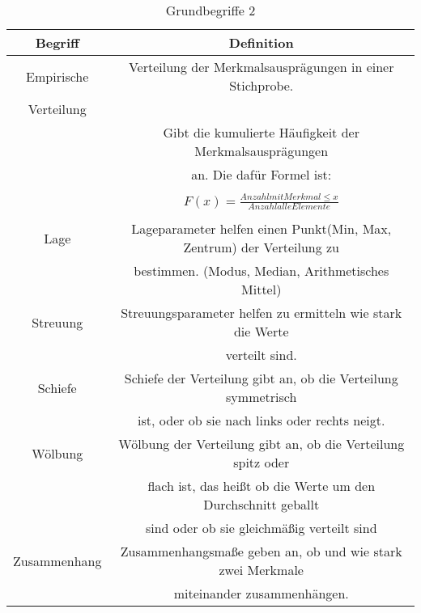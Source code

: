 \documentclass[12pt]{scrartcl}
\begin{document}
\begin{table}[h]
    \begin{tabular}{ | c | c | }
        \hline
        Begriff      & Definition                                                            \\
        \hline
        \hline
        Empirische   & Verteilung der Merkmalsausprägungen in einer Stichprobe.              \\
        Verteilung   &                                                                       \\
                     & Gibt die kumulierte Häufigkeit der Merkmalsausprägungen               \\
                     & an. Die dafür Formel ist:                                             \\&\\
                     & $F(x) =\frac{Anzahl mit Merkmal \leq x}
        {Anzahl alle Elemente}$                                                              \\&\\
        \hline
        Lage         & Lageparameter helfen einen Punkt(Min, Max, Zentrum) der Verteilung zu \\
                     & bestimmen. (Modus, Median, Arithmetisches Mittel)                     \\
        \hline
        Streuung     & Streuungsparameter helfen zu ermitteln wie stark die Werte            \\
                     & verteilt sind.                                                        \\
        \hline
        Schiefe      & Schiefe der Verteilung gibt an, ob die Verteilung symmetrisch         \\
                     & ist, oder ob sie nach links oder rechts neigt.                        \\
        \hline
        Wölbung      & Wölbung der Verteilung gibt an, ob die Verteilung spitz oder          \\
                     & flach ist, das heißt ob die Werte um den Durchschnitt geballt         \\
                     & sind oder ob sie gleichmäßig verteilt sind                            \\
        \hline
        Zusammenhang & Zusammenhangsmaße geben an, ob und wie stark zwei Merkmale            \\
                     & miteinander zusammenhängen.                                           \\
        \hline
    \end{tabular}
    \caption{Grundbegriffe 2}
\end{table}
\end{document}
